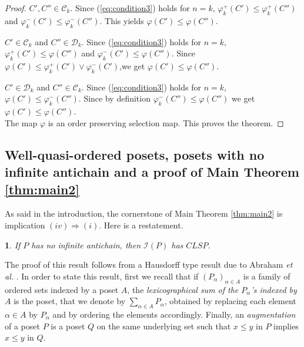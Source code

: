 \documentclass[12pt]{amsart}
\newtheorem{lemma}[definition]{\noindent {\bf Lemma}}
\begin{document}
\begin{proof}
\medskip

 $C', C''\in \mathcal C_{k}$. 
Since (\ref{eq:condition3}) holds for $n=k$, $\varphi_{k}^{+}(C')\leq
\varphi_{k}^{+}(C'')$ and $\varphi_{k}^{-}(C')\leq
\varphi_{k}^{-}(C'')$. This yields $\varphi(C')\leq \varphi(C'')$.\\

\medskip

 $C'\in \mathcal C_{k}$ and $C''\in \mathcal D_{k}$. 
Since (\ref{eq:condition3}) holds for $n=k$, $\varphi_{k}^{+}(C')\leq
\varphi(C'')$ and $\varphi_{k}^{-}(C')\leq \varphi(C'')$. Since
$\varphi (C')\leq \varphi_{k}^{+}(C')\vee \varphi_{k}^{-}(C')$,we get
$\varphi(C')\leq \varphi(C'')$.\\

\medskip

 $C'\in \mathcal D_{k}$ and $C''\in \mathcal C_{k}$. 
Since (\ref{eq:condition3}) holds for $n=k$, $\varphi (C')\leq
\varphi_{k}^{-}(C'')$. Since by definition $\varphi_{k}^{-}(C'')\leq
\varphi (C'')$ we get $\varphi (C')\leq \varphi(C'')$. \\
 
\noindent The map $\varphi$ is an order preserving selection
map. This proves the theorem. \end{proof} 

\subsection{Well-quasi-ordered posets, posets with no infinite antichain and a proof of Main Theorem \ref{thm:main2}} 
As said in the introduction, the cornerstone of Main Theorem
\ref{thm:main2} is implication $(iv)\Rightarrow (i)$.  Here is a
restatement.

\begin{lemma}\label{lem:key}
If $P$ has no infinite antichain, then $\mathcal {I}(P)$ has $CLSP$.
\end{lemma}

\noindent
The proof of this result follows from a Hausdorff type result due to
Abraham {\it et al.} \cite{abraham-all}.  In order to state this
result, first we recall that if $(P_{\alpha})_{\alpha \in A}$ is a family of
ordered sets indexed by a poset $A$, the \emph{lexicographical sum of
the $P_{\alpha}$'s indexed by $A$} is the poset, that we denote by
$\sum_{\alpha \in A}P_{\alpha}$, obtained by replacing each element
$\alpha\in A$ by $P_{\alpha}$ and by ordering the elements
accordingly. Finally, an \emph{augmentation} of a poset $P$ is a poset
$Q$ on the same underlying set such that $x \le y$ in $P$ implies $x
\le y$ in $Q$.
\end{document}
